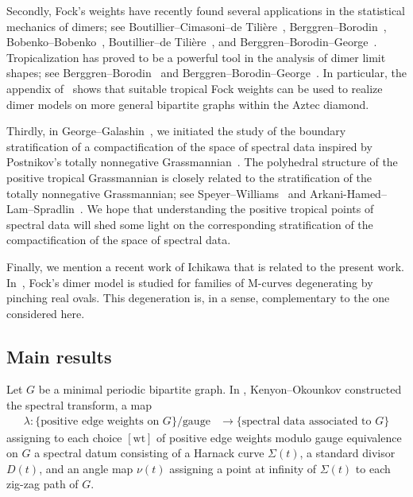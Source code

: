 \documentclass[12pt]{amsart}
\numberwithin{equation}{section}
\theoremstyle{definition}
\def\Gtor{G}
\newcommand{\wt}{\mathrm{wt}}
\def\divisor{D}
\def\divisor{D}
\def\mcurve{\Sigma}
\begin{document}
Secondly, Fock's weights have recently found several applications in the statistical mechanics of dimers; see Boutillier--Cimasoni--de Tili\`ere~\cite{BDdT}, Berggren--Borodin~\cite{Berggren-Borodin-Aztec}, Bobenko--Bobenko~\cite{Bob2}, Boutillier--de Tili\`ere~\cite{BoutillierTiliereAztec}, and Berggren--Borodin--George~\cite{BerggrenBorodinGeorge}. Tropicalization has proved to be a powerful tool in the analysis of dimer limit shapes; see Berggren--Borodin~\cite{Berggren-Borodin-tropical} and Berggren--Borodin--George~\cite{BerggrenBorodinGeorge}. In particular, the appendix of~\cite{BerggrenBorodinGeorge} shows that suitable tropical Fock weights can be used to realize dimer models on more general bipartite graphs within the Aztec diamond.

Thirdly, in George--Galashin~\cite{GalashinGeorge2024}, we initiated
the study of the boundary stratification of a compactification of the
space of spectral data inspired by Postnikov's totally nonnegative
Grassmannian~\cite{postnikov2006total}. The polyhedral structure of the
positive tropical Grassmannian is closely related to the stratification
of the totally nonnegative Grassmannian; see
Speyer--Williams~\cite{SpeyerWilliams1,SpeyerWilliams2} and
Arkani-Hamed--Lam--Spradlin~\cite{ArkaniHamedLamSpradlin}. We hope that
understanding the positive tropical points of spectral data will shed
some light on the corresponding stratification of the compactification
of the space of spectral data.

Finally, we mention a recent work of Ichikawa that is related to the present work. In~\cite{IchikawaDegenerating}, Fock's dimer model is studied for families of M-curves degenerating by pinching real ovals. This degeneration is, in a sense, complementary to the one considered here. 

\subsection{Main results}

Let $\Gtor$ be a minimal periodic bipartite graph. In \cite{KO07b}, Kenyon--Okounkov constructed the spectral transform, a map
\begin{align*}
 \lambda: \{\text{positive edge weights on $\Gtor$}\}/\text{gauge} & \to \{\text{spectral data associated to $\Gtor$}\}
\end{align*}
assigning to each choice $[\wt]$ of positive edge weights modulo gauge equivalence on $\Gtor$ a spectral datum consisting of a Harnack curve $\mcurve(t)$,  a standard divisor $\divisor(t)$, and an angle map $\nu(t)$ assigning a point at infinity of $\mcurve(t)$ to each
zig-zag path of $\Gtor$. 
\end{document}
